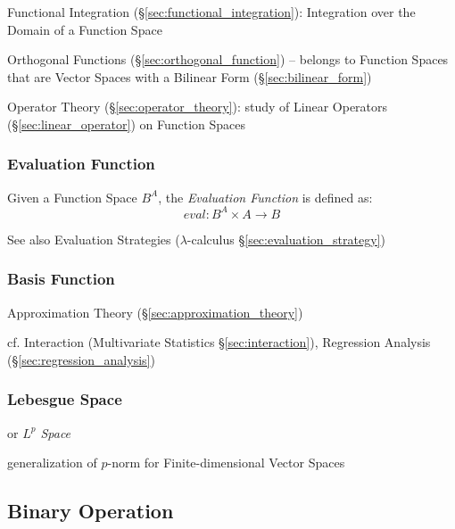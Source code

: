\fist Functional Integration (\S\ref{sec:functional_integration}): Integration
over the Domain of a Function Space

\fist Orthogonal Functions (\S\ref{sec:orthogonal_function}) -- belongs to
Function Spaces that are Vector Spaces with a Bilinear Form
(\S\ref{sec:bilinear_form})

\fist Operator Theory (\S\ref{sec:operator_theory}): study of Linear Operators
(\S\ref{sec:linear_operator}) on Function Spaces



\subsubsection{Evaluation Function}\label{sec:evaluation_function}

Given a Function Space $B^A$, the \emph{Evaluation Function} is
defined as:
\[
  eval : B^A \times A \to B
\]

\fist See also Evaluation Strategies ($\lambda$-calculus
\S\ref{sec:evaluation_strategy})



\subsubsection{Basis Function}\label{sec:basis_function}

Approximation Theory (\S\ref{sec:approximation_theory})

cf. Interaction (Multivariate Statistics \S\ref{sec:interaction}), Regression
Analysis (\S\ref{sec:regression_analysis})



\subsubsection{Lebesgue Space}\label{sec:lebesgue_space}

or \emph{$L^p$ Space}

generalization of $p$-norm for Finite-dimensional Vector Spaces



\subsection{Binary Operation}\label{sec:binary_operation}

